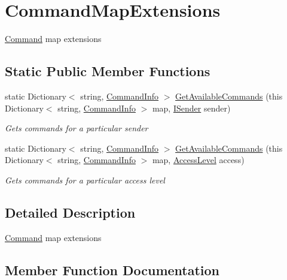 \hypertarget{classOTA_1_1Command_1_1CommandMapExtensions}{}\section{Command\+Map\+Extensions}
\label{classOTA_1_1Command_1_1CommandMapExtensions}


\hyperlink{namespaceOTA_1_1Command}{Command} map extensions  


\subsection*{Static Public Member Functions}
\begin{DoxyCompactItemize}
\item 
static Dictionary$<$ string, \hyperlink{classOTA_1_1Command_1_1CommandInfo}{Command\+Info} $>$ \hyperlink{classOTA_1_1Command_1_1CommandMapExtensions_a0658f88248b1f806a7d0e42b057b7a0c}{Get\+Available\+Commands} (this Dictionary$<$ string, \hyperlink{classOTA_1_1Command_1_1CommandInfo}{Command\+Info} $>$ map, \hyperlink{interfaceOTA_1_1Command_1_1ISender}{I\+Sender} sender)
\begin{DoxyCompactList}\small\item\em Gets commands for a particular sender \end{DoxyCompactList}\item 
static Dictionary$<$ string, \hyperlink{classOTA_1_1Command_1_1CommandInfo}{Command\+Info} $>$ \hyperlink{classOTA_1_1Command_1_1CommandMapExtensions_a7258fbc8d04a3d91226bd30ee8079822}{Get\+Available\+Commands} (this Dictionary$<$ string, \hyperlink{classOTA_1_1Command_1_1CommandInfo}{Command\+Info} $>$ map, \hyperlink{namespaceOTA_1_1Command_a0bb463ef02a9fd3406866a98c6fc2cdc}{Access\+Level} access)
\begin{DoxyCompactList}\small\item\em Gets commands for a particular access level \end{DoxyCompactList}\end{DoxyCompactItemize}


\subsection{Detailed Description}
\hyperlink{namespaceOTA_1_1Command}{Command} map extensions 



\subsection{Member Function Documentation}
\hypertarget{classOTA_1_1Command_1_1CommandMapExtensions_a0658f88248b1f806a7d0e42b057b7a0c}{}
